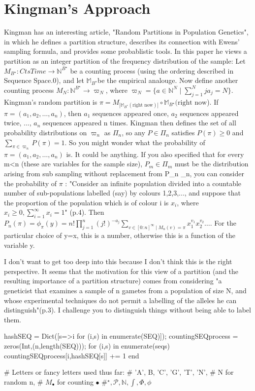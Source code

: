 \section{Kingman's Approach}
Kingman has an interesting article, "Random Partitions in Population Genetics", in which he defines a partition structure, describes its connection with Ewens' sampling formula, and provides some probablistic tools. In this paper he views a partition as an integer partition of the frequency distribution of the sample:
 Let $M_{B^\star}: CtsTime \to \mathbb{N}^{B^\star}$ be a counting process (using the ordering described in Sequence Space.0), and let $\mathbb{M}_{B^\star} $be the empirical analouge. Now define another counting process $M_N:\mathbb{N}^{B^\star} \to \varpi_N$, where $\varpi_N = \{a\in\mathbb{N}^N \mid\sum_{j=1}^N ja_j = N\}$. Kingman's random partition is $\pi = M_{|\mathbb{M}_{B^\star}(\text{right now})|}\circ\mathbb{M}_{B^\star}(\text{right now}$). If $\pi=(a_1,a_2,\dots,a_n)$, then $a_1$ sequences appeared once, $a_2$ sequences appeared twice, ..., $a_n $ sequences appeared n times.
Kingman then defines the set of all probability distributions on $\varpi_n$ as $\Pi_n$, so any $P \in \Pi_n$ satisfies $P(\pi)\ge 0 $ and $\sum_{\pi\in\varpi_n} P(\pi) = 1$. So you might wonder what the probability of $\pi=(a_1,a_2,\dots,a_n)$ is. It could be anything. If you also specified that for every m<n (these are variables for the sample size), $P_m\in\Pi_m $ must be the distribution arising from sub sampling without replacement from P_n \in \Pi_n, you can consider the probability of $\pi$ :
"Consider an infinite population divided into a countable number of sub-populations labelled (say) by colours 1,2,3,..., and suppose that the proportion of the population which is of colour i is $x_i$, where $x_i \ge 0, \sum_{i=1}^\infty x_i = 1$" (p.4). Then $P_n(\pi) = \phi_\pi(y) = n!\prod_{j=1}^n (j!)^{-a_j} \sum_{v\in[0:n]^\infty \mid M_n(v) = \pi } x_1^{v_1}x_2^{v_2}\dots $. 
For the particular choice of y=x, this is a number, otherwise this is a function of the variable y.

I don't want to get too deep into this because I don't think this is the right perspective. It seems that the motivation for this view of a partition (and the resulting importance of a partition structure) comes from considering "a geneticist that examines a sample of n gametes from a population of size N, and whose experimental techniques do not permit a labelling of the alleles he can distinguish"(p.3). 
I challenge you to distinguish things without being able to label them.

hashSEQ = Dict([s=>i for (i,s) in enumerate(SEQ)]);
countingSEQprocess = zeros(Int,(n,length(SEQ)));
for (i,s) in enumerate(seqs)
	countingSEQprocess[i,hashSEQ[s]] += 1
end

# Letters or fancy letters used thus far:
# 'A', B, 'C', 'G', 'T', 'N',
# N for random n,
# $M_\bullet $ for counting $\bullet$
#$ ^\star ,\mathscr{P},\mathbb{N},\int,\Phi,\phi$